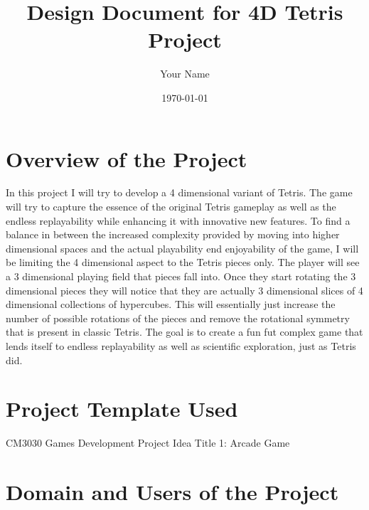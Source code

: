 \documentclass{article}
\begin{document}
\title{Design Document for 4D Tetris Project}
\author{Your Name}
\date{\today}
\maketitle

\tableofcontents
\newpage

\section{Overview of the Project}

In this project I will try to develop a 4 dimensional variant of Tetris. The game will try to capture the essence of the original Tetris gameplay as well as the endless replayability while enhancing it with innovative new features. To find a balance in between the increased complexity provided by moving into higher dimensional spaces and the actual playability end enjoyability of the game, I will be limiting the 4 dimensional aspect to the Tetris pieces only. The player will see a 3 dimensional playing field that pieces fall into. Once they start rotating the 3 dimensional pieces they will notice that they are actually 3 dimensional slices of 4 dimensional collections of hypercubes. This will essentially just increase the number of possible rotations of the pieces and remove the rotational symmetry that is present in classic Tetris.
The goal is to create a fun fut complex game that lends itself to endless replayability as well as scientific exploration, just as Tetris did.

\section{Project Template Used}
CM3030 Games Development Project Idea Title 1: Arcade Game

\section{Domain and Users of the Project}
\end{document}

